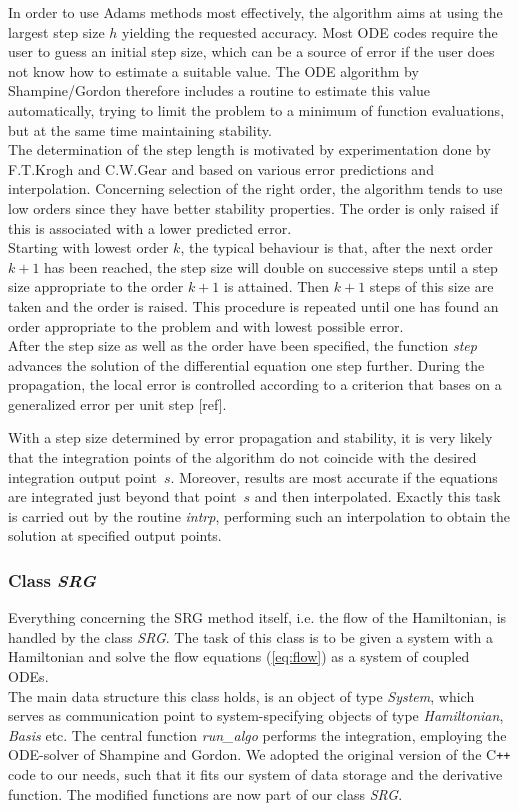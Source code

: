 In order to use Adams methods most effectively, the algorithm aims at using the largest step size $h$ yielding the requested accuracy. Most ODE codes require the user to guess an initial step size, which can be a source of error if the user does not know how to estimate a suitable value. The ODE algorithm by Shampine/Gordon therefore includes a routine to estimate this value automatically, trying to limit the problem to a minimum of function evaluations, but at the same time maintaining stability. \\
The determination of the step length is motivated by experimentation done by F.T.Krogh \cite{DBLP:confifip/Krogh68} and C.W.Gear \cite{Gear68} and based on various error predictions and interpolation. Concerning selection of the right order, the algorithm tends to use low orders since they have better stability properties. The order is only raised if this is associated with a lower predicted error.\\
Starting with lowest order $k$, the typical behaviour is that, after the next order $k+1$ has been reached, the step size will double on successive steps until a step size appropriate to the order $k+1$ is attained. Then $k+1$ steps of this size are taken and the order is raised. This procedure is repeated until one has found an order appropriate to the problem and with lowest possible error.\\
After the step size as well as the order have been specified, the function \textit{step} advances the solution of the differential equation one step further. During the propagation, the local error is controlled according to a criterion that bases on a generalized error per unit step [ref].

With a step size determined by error propagation and stability, it is very likely that the integration points of the algorithm do not coincide with the desired integration output \mbox{point $s$}. Moreover, results are most accurate if the equations are integrated just beyond that \mbox{point $s$} and then interpolated. Exactly this task is carried out by the routine \textit{intrp}, performing such an interpolation to obtain the solution at specified output points. 

\subsubsection{Class \textit{SRG}}

Everything concerning the SRG method itself, i.e. the flow of the Hamiltonian, is handled by the class \textit{SRG}. The task of this class is to be given a system with a Hamiltonian and solve the flow equations (\ref{eq:flow}) as a system of coupled ODEs. \\
The main data structure this class holds, is an object of type \textit{System}, which serves as communication point to system-specifying objects of type \textit{Hamiltonian}, \textit{Basis} etc. The central function  \textit{run\_algo}  performs the integration, employing the ODE-solver of Shampine and Gordon. We adopted the original version of the C{}\verb!++! code \cite{odesolver} to our needs, such that it fits our system of data storage and the derivative function. The modified functions are now part of our class \textit{SRG}.

